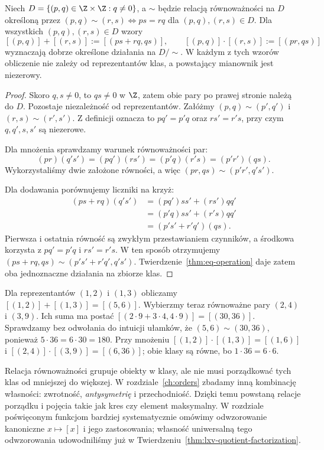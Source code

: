 \begin{twierdzenie}
\label{thm:eq-fraction-operations-xliii}
Niech $D=\{(p,q)\in\Z\times\Z:q\ne0\}$,
a $\sim$ będzie relacją równoważności na $D$ określoną przez
$(p,q)\sim(r,s)\iff ps=rq$ dla $(p,q),(r,s)\in D$.
Dla wszystkich $(p,q),(r,s)\in D$ wzory
\[
 [(p,q)]+[(r,s)]:=[(ps+rq,qs)],\qquad
 [(p,q)]\cdot[(r,s)]:=[(pr,qs)]
\]
wyznaczają dobrze określone działania na $D/{\sim}$.
W każdym z tych wzorów obliczenie nie zależy od
reprezentantów klas, a powstający mianownik jest niezerowy.
\end{twierdzenie}
\begin{proof}
Skoro $q,s\ne0$, to $qs\ne0$ w $\Z$, zatem obie
pary po prawej stronie należą do $D$. Pozostaje
niezależność od reprezentantów.
Załóżmy $(p,q)\sim(p',q')$ i $(r,s)\sim(r',s')$.
Z definicji oznacza to
$ p q'=p'q$ oraz $r s'=r's$, przy czym
$q,q',s,s'$ są niezerowe.

Dla mnożenia sprawdzamy warunek równoważności par:
\[
 (pr)(q's')=(pq')(rs')=(p'q)(r's)=(p'r')(qs).
\]
Wykorzystaliśmy dwie założone równości, a więc
$(pr,qs)\sim(p'r',q's')$.

Dla dodawania porównujemy liczniki na krzyż:
\begin{align*}
 (ps+rq)(q's')
 &= (pq')ss'+(rs')qq'\\
 &= (p'q)ss'+(r's)qq'\\
 &= (p's'+r'q')(qs).
\end{align*}
Pierwsza i ostatnia równość są zwykłym przestawianiem
czynników, a środkowa korzysta z $pq'=p'q$ i
$rs'=r's$. W ten sposób otrzymujemy
$(ps+rq,qs)\sim(p's'+r'q',q's')$.
Twierdzenie~\ref{thm:eq-operation} daje zatem oba
jednoznaczne działania na zbiorze klas.
\end{proof}
\begin{przyklad}
\label{ex:eq-fraction-arithmetic-xliii}
Dla reprezentantów $(1,2)$ i $(1,3)$ obliczamy
$[(1,2)]+[(1,3)]=[(5,6)]$.
Wybierzmy teraz równoważne pary $(2,4)$ i $(3,9)$.
Ich suma ma postać $[(2\cdot9+3\cdot4,4\cdot9)]
=[(30,36)]$. Sprawdzamy bez odwołania do intuicji
ułamków, że $(5,6)\sim(30,36)$, ponieważ
$5\cdot36=6\cdot30=180$.
Przy mnożeniu
$[(1,2)]\cdot[(1,3)]=[(1,6)]$ i
$[(2,4)]\cdot[(3,9)]=[(6,36)]$; obie klasy są równe,
bo $1\cdot36=6\cdot6$.
\end{przyklad}



\begin{uwaga}
Relacja równoważności grupuje obiekty w klasy, ale nie musi
porządkować tych klas od mniejszej do większej.
W rozdziale~\ref{ch:orders} zbadamy inną kombinację własności:
zwrotność, \emph{antysymetrię} i przechodniość. Dzięki temu
powstaną relacje porządku i pojęcia takie jak kres czy element
maksymalny. W rozdziale poświęconym funkcjom bardziej systematycznie
omówimy odwzorowanie kanoniczne $x\mapsto[x]$ i jego zastosowania;
własność uniwersalną tego odwzorowania udowodniliśmy już
w Twierdzeniu~\ref{thm:lxv-quotient-factorization}.
\end{uwaga}
